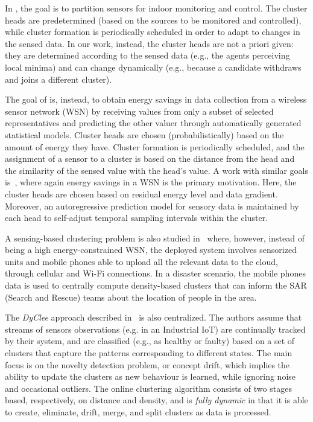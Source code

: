 In \cite{DBLP:conf/ccnc/LinM07}, the goal is to partition sensors for indoor monitoring and control. The cluster heads are predetermined (based on the sources to be monitored and controlled),
 while cluster formation is periodically scheduled in order to adapt to changes in the sensed data.
%
In our work, instead, the cluster heads are not a priori given:
 they are determined according to the sensed data
 (e.g., the agents perceiving local minima)
 and can change dynamically
 (e.g., because a candidate withdraws and joins a different cluster).

The goal of \cite{DBLP:journals/tpds/GedikLY07} is, instead, to obtain energy savings in data collection from a wireless sensor network (WSN) by receiving values from only a subset of selected representatives and predicting the other valuer through automatically generated statistical models.
 Cluster heads are chosen (probabilistically) based on the amount of energy they have. Cluster formation is periodically scheduled, and the assignment of a sensor to a cluster is based on the distance from the head and the similarity of the sensed value with the head's value.
%
A work with similar goals is~\cite{DBLP:journals/ijdsn/CaiZ18}, where again energy savings in a WSN is the primary motivation. Here, the cluster heads are chosen based on residual energy level and data gradient.
 Moreover, an autoregressive prediction model for sensory data is maintained by each head to self-adjust temporal sampling intervals within the cluster.

A sensing-based clustering problem is also studied in~\cite{DBLP:journals/jaihc/KucukBSK20} where, however, instead of being a high energy-constrained WSN, the deployed system involves sensorized units and mobile phones able to upload all the relevant data to the cloud, through cellular and Wi-Fi connections. In a disaster scenario, the mobile phones data is used to centrally compute density-based clusters that can inform the SAR (Search and Rescue) teams about the location of people in the area.

The {\em DyClee} approach described in~\cite{DBLP:journals/pr/RoaTG19} is also centralized. The authors assume that streams of sensors observations (e.g. in an Industrial IoT) are continually tracked by their system, and are classified (e.g., as healthy or faulty) based on a set of clusters that capture the patterns corresponding to different states. The main focus is on the novelty detection problem, or concept drift, which implies the ability to update the clusters as new behaviour is learned, while ignoring noise and occasional outliers. The online clustering algorithm consists of two stages based, respectively, on distance and density, and is {\em fully dynamic} in that it is able to create, eliminate, drift, merge, and split clusters as data is processed.



